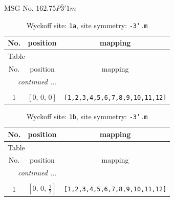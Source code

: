 \documentclass[fleqn,8pt]{jsarticle}
\begin{document}
\setcounter{MaxMatrixCols}{32}

\renewcommand{\tablename}{Table~}
\renewcommand{\figurename}{Figure~}
\begin{center}
\LARGE
MSG No. 162.75\quad$P\bar{3}'1m$
\end{center}
\renewcommand{\arraystretch}{1.2}
\begin{longtable}{ccc}
\caption{Wyckoff site: {\tt 1a}, site symmetry: {\tt -3'.m}}
 \\
 \hline \hline
No. & position & mapping \\ \hline \endfirsthead

\multicolumn{2}{l}{\tablename\ \thetable{}} \\
 \hline \hline
No. & position & mapping \\ \hline \endhead

 \hline \hline
\multicolumn{2}{r}{\footnotesize\it continued ...} \\ \endfoot

 \hline \hline
\multicolumn{2}{r}{} \\ \endlastfoot

1 & $\left[ 0,\, 0,\, 0 \right]$ & {\tt [1,2,3,4,5,6,7,8,9,10,11,12]} \\
\end{longtable}
\renewcommand{\arraystretch}{1.2}
\begin{longtable}{ccc}
\caption{Wyckoff site: {\tt 1b}, site symmetry: {\tt -3'.m}}
 \\
 \hline \hline
No. & position & mapping \\ \hline \endfirsthead

\multicolumn{2}{l}{\tablename\ \thetable{}} \\
 \hline \hline
No. & position & mapping \\ \hline \endhead

 \hline \hline
\multicolumn{2}{r}{\footnotesize\it continued ...} \\ \endfoot

 \hline \hline
\multicolumn{2}{r}{} \\ \endlastfoot

1 & $\left[ 0,\, 0,\, \frac{1}{2} \right]$ & {\tt [1,2,3,4,5,6,7,8,9,10,11,12]} \\
\end{longtable}
\renewcommand{\arraystretch}{1.2}
\end{document}
